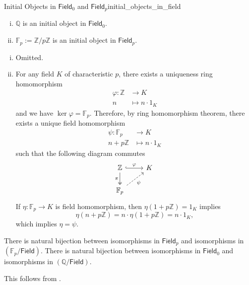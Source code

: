 \begin{proposition}{Initial Objects in $\mathsf{Field}_0$ and $\mathsf{Field}_p$}{initial_objects_in_field}
    \begin{enumerate}[(i)]
        \item $\mathbb{Q}$ is an initial object in $\mathsf{Field}_0$.
        \item $\mathbb{F}_p:=\mathbb{Z}/p\mathbb{Z}$ is an initial object in $\mathsf{Field}_p$.
    \end{enumerate}
\end{proposition}
\begin{prf}
    \begin{enumerate}[(i)]
        \item Omitted.
        \item For any field $K$ of characteristic $p$, there exists a uniqueness ring homomorphism
        \begin{align*}
            \varphi:\mathbb{Z}&\longrightarrow K\\
            n&\longmapsto n\cdot 1_K
        \end{align*}
        and we have $\ker \varphi=\mathbb{F}_p$. Therefore, by ring homomorphism theorem, there exists a unique field homomorphism 
        \begin{align*}
            \psi:\mathbb{F}_p&\longrightarrow K \\
            n+ p\mathbb{Z} &\longmapsto n\cdot 1_K
        \end{align*}
        such that the following diagram commutes
        \[
            \begin{tikzcd}
                \mathbb{Z} \arrow[r, "\varphi", hook] \arrow[d, "\pi"', two heads] & K \\
                \mathbb{F}_p \arrow[ru, "\psi"', dashed]                           &  
                \end{tikzcd}
        \]
        If $\eta:\mathbb{F}_p\to K$ is field homomorphism, then $\eta(1+p\mathbb{Z})=1_K$ implies
        \[
        \eta(n+p\mathbb{Z})=n\cdot \eta(1+p\mathbb{Z})=n\cdot 1_K,
        \]
        which implies $\eta=\psi$.
    \end{enumerate}
\end{prf}

\begin{corollary}{}{}
    There is natural bijection between isomorphisms in $\mathsf{Field}_p$ and isomorphisms in $(\mathbb{F}_p/\mathsf{Field})$. There is natural bijection between isomorphisms in $\mathsf{Field}_0$ and isomorphisms in $(\mathbb{Q}/\mathsf{Field})$.
\end{corollary}
\begin{prf}
    This follows from .
\end{prf}

